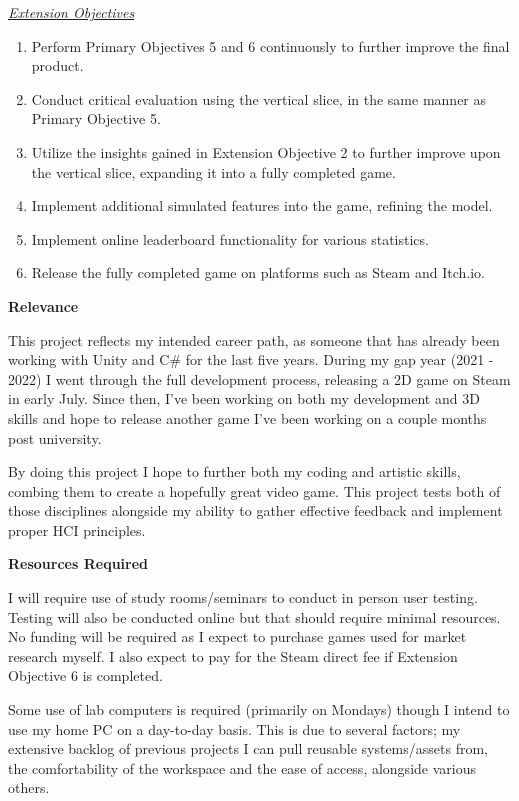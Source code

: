 \documentclass{report}
\begin{document}
\begin{appendices}
\underline{\textit{Extension Objectives}}

\begin{enumerate}
	\item Perform Primary Objectives 5 and 6 continuously to further improve the final product.
	\item Conduct critical evaluation using the vertical slice, in the same manner as Primary Objective 5.
	\item Utilize the insights gained in Extension Objective 2 to further improve upon the vertical slice, expanding it into a fully completed game.
	\item Implement additional simulated features into the game, refining the model.
	\item Implement online leaderboard functionality for various statistics.
	\item Release the fully completed game on platforms such as Steam and Itch.io.
\end{enumerate}

\textbf{Relevance}

This project reflects my intended career path, as someone that has already been working with Unity and C\# for the last five years. During my gap year (2021 - 2022) I went through the full development process, releasing a 2D game on Steam in early July. Since then, I’ve been working on both my development and 3D skills and hope to release another game I’ve been working on a couple months post university.

By doing this project I hope to further both my coding and artistic skills, combing them to create a hopefully great video game. This project tests both of those disciplines alongside my ability to gather effective feedback and implement proper HCI principles.

\textbf{Resources Required}

I will require use of study rooms/seminars to conduct in person user testing. Testing will also be conducted online but that should require minimal resources. No funding will be required as I expect to purchase games used for market research myself. I also expect to pay for the Steam direct fee if Extension Objective 6 is completed.

Some use of lab computers is required (primarily on Mondays) though I intend to use my home PC on a day-to-day basis. This is due to several factors; my extensive backlog of previous projects I can pull reusable systems/assets from, the comfortability of the workspace and the ease of access, alongside various others.


\end{appendices}
\end{document}

